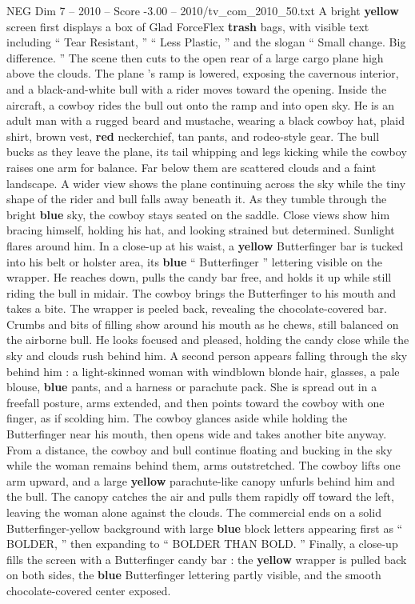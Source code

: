 \begin{textsample}{NEG Dim 7 – 2010 – Score -3.00 – 2010/tv\_com\_2010\_50.txt}  \label{ex:f7_neg_049}
A bright \textbf{yellow} screen first displays a box of Glad ForceFlex \textbf{trash} bags, with visible text including “ Tear Resistant, ” “ Less Plastic, ” and the slogan “ Small change.
Big difference. ” The scene then cuts to the open rear of a large cargo plane high above the clouds.
The plane ’s ramp is lowered, exposing the cavernous interior, and a black-and-white bull with a rider moves toward the opening.
Inside the aircraft, a cowboy rides the bull out onto the ramp and into open sky.
He is an adult man with a rugged beard and mustache, wearing a black cowboy hat, plaid shirt, brown vest, \textbf{red} neckerchief, tan pants, and rodeo-style gear.
The bull bucks as they leave the plane, its tail whipping and legs kicking while the cowboy raises one arm for balance.
Far below them are scattered clouds and a faint landscape.
A wider view shows the plane continuing across the sky while the tiny shape of the rider and bull falls away beneath it.
As they tumble through the bright \textbf{blue} sky, the cowboy stays seated on the saddle.
Close views show him bracing himself, holding his hat, and looking strained but determined.
Sunlight flares around him.
In a close-up at his waist, a \textbf{yellow} Butterfinger bar is tucked into his belt or holster area, its \textbf{blue} “ Butterfinger ” lettering visible on the wrapper.
He reaches down, pulls the candy bar free, and holds it up while still riding the bull in midair.
The cowboy brings the Butterfinger to his mouth and takes a bite.
The wrapper is peeled back, revealing the chocolate-covered bar.
Crumbs and bits of filling show around his mouth as he chews, still balanced on the airborne bull.
He looks focused and pleased, holding the candy close while the sky and clouds rush behind him.
A second person appears falling through the sky behind him : a light-skinned woman with windblown blonde hair, glasses, a pale blouse, \textbf{blue} pants, and a harness or parachute pack.
She is spread out in a freefall posture, arms extended, and then points toward the cowboy with one finger, as if scolding him.
The cowboy glances aside while holding the Butterfinger near his mouth, then opens wide and takes another bite anyway.
From a distance, the cowboy and bull continue floating and bucking in the sky while the woman remains behind them, arms outstretched.
The cowboy lifts one arm upward, and a large \textbf{yellow} parachute-like canopy unfurls behind him and the bull.
The canopy catches the air and pulls them rapidly off toward the left, leaving the woman alone against the clouds.
The commercial ends on a solid Butterfinger-yellow background with large \textbf{blue} block letters appearing first as “ BOLDER, ” then expanding to “ BOLDER THAN BOLD. ” Finally, a close-up fills the screen with a Butterfinger candy bar : the \textbf{yellow} wrapper is pulled back on both sides, the \textbf{blue} Butterfinger lettering partly visible, and the smooth chocolate-covered center exposed.

\end{textsample}

